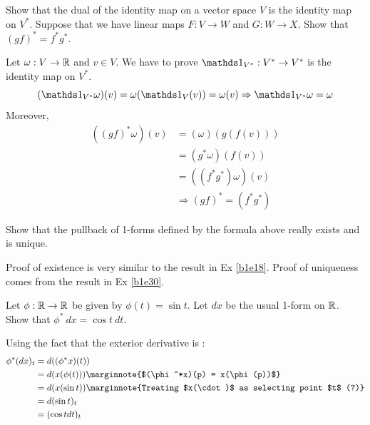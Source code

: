 \documentclass[10pt]{article}
\begin{document}
\begin{example}\label{b1e31}
	Show that the dual of the identity map on a vector space $V$ is the identity map on $V^*$. Suppose that we have linear maps $F:V\to W$ and $G:W\to X$. Show that $(gf)^* = f^*g^*$.
\end{example}
\sol Let $\omega: V \to \mathbb{R}$ and $v \in V$. We have to prove $\id_{V^*}:V^*\to V^*$ is the identity map on $V^*$. 
$$
	(\id_{V^*}\omega)(v) = \omega(\id_V(v)) = \omega(v) \Rightarrow \id_{V^*}\omega = \omega
$$
Moreover,
$$
\begin{aligned}
	((gf)^*\omega)(v) &= (\omega)(g(f(v)))\\
	&= (g^*\omega)(f(v))\\
	&= ((f^*g^*)\omega)(v)\\
	& \Rightarrow (gf)^* = (f^*g^*)
\end{aligned}
$$

\begin{example}
	Show that the pullback of 1-forms defined by the formula above really exists and is unique.
\end{example}
\sol Proof of existence is very similar to the result in Ex \ref{b1e18}.
Proof of uniqueness comes from the result in Ex \ref{b1e30}.


\begin{example}
	Let $\phi:\mathbb{R}\to\mathbb{R}$ be given by $\phi(t)=\sin t$. Let $dx$ be the usual 1-form on $\mathbb{R}$. Show that $\phi^*\:dx = \cos t\:dt$.
\end{example}
\sol Using the fact that the exterior derivative is :
$$
\begin{aligned}
	\phi^*(dx)_t &= d((\phi^*x)(t))\\
	&= d(x(\phi(t)))\marginnote{$(\phi^*x)(p) = x(\phi(p))$}\\
	&= d(x(\sin t))\marginnote{Treating $x(\cdot)$ as selecting point $t$ (?)}\\
	&= d(\sin t)_t\\
	&= (\cos t dt)_t\\
\end{aligned}
$$
\end{document}
